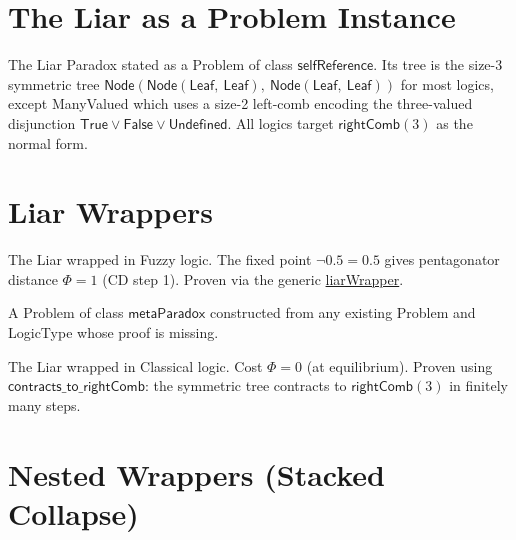 \section{The Liar as a Problem Instance}

\begin{definition}
\label{def:liar_problem}
\leanok
{}
The Liar Paradox stated as a \textsf{Problem} of class $\mathsf{selfReference}$.
Its tree is the size-3 symmetric tree $\mathsf{Node}(\mathsf{Node}(\mathsf{Leaf},\ \mathsf{Leaf}),\ \mathsf{Node}(\mathsf{Leaf},\ \mathsf{Leaf}))$
for most logics, except ManyValued which uses a size-2 left-comb encoding the
three-valued disjunction $\mathsf{True} \lor \mathsf{False} \lor \mathsf{Undefined}$.
All logics target $\mathsf{rightComb}(3)$ as the normal form.
\end{definition}

\section{Liar Wrappers}

\begin{definition}
\label{def:fuzzy_liar}
\leanok
{}
The Liar wrapped in Fuzzy logic. The fixed point $\neg 0.5 = 0.5$ gives
pentagonator distance $\Phi = 1$ (CD step 1). Proven via the generic
\hyperref[def:liar_wrapper]{liarWrapper}.
\end{definition}

\begin{definition}
\label{def:metaparadox}
\leanok
{}
A \textsf{Problem} of class $\mathsf{metaParadox}$ constructed from any
existing Problem and LogicType whose proof is missing.
\end{definition}

\begin{definition}
\label{def:classical_liar}
\leanok
{}
The Liar wrapped in Classical logic. Cost $\Phi = 0$ (at equilibrium).
Proven using $\mathsf{contracts\_to\_rightComb}$: the symmetric tree contracts
to $\mathsf{rightComb}(3)$ in finitely many steps.
\end{definition}

\section{Nested Wrappers (Stacked Collapse)}

